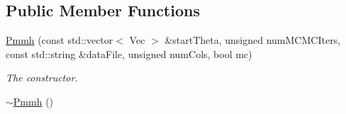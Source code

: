\subsection*{Public Member Functions}
\begin{DoxyCompactItemize}
\item 
\hyperlink{classPmmh_aa4752fceaa1b278fcadb583865bfd0b5}{Pmmh} (const std\+::vector$<$ Vec $>$ \&start\+Theta, unsigned num\+M\+C\+M\+C\+Iters, const std\+::string \&data\+File, unsigned num\+Cols, bool mc)
\begin{DoxyCompactList}\small\item\em The constructor. \end{DoxyCompactList}\item 
\hyperlink{classPmmh_a52b058761ac6ede77eb3d8c0099e0d93}{$\sim$\+Pmmh} ()\hypertarget{classPmmh_a52b058761ac6ede77eb3d8c0099e0d93}{}\label{classPmmh_a52b058761ac6ede77eb3d8c0099e0d93}


\end{DoxyCompactItemize}
